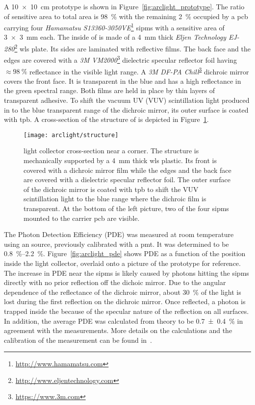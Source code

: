 A \SI{10 x 10}{\centi\metre} \AL{} prototype is shown in Figure~\ref{fig:arclight_prototype}.
The ratio of sensitive area to total area is \SI{98}{\percent} with the remaining \SI{2}{\percent} occupied by a \gls{pcb} carrying four \emph{Hamamatsu S13360-3050VE}\footnote{\url{http://www.hamamatsu.com}} \glspl{sipm} with a sensitive area of \SI{3 x 3}{\milli\metre} each.
The inside of \AL{} is made of a \SI{4}{\milli\metre} thick \emph{Eljen Technology EJ-280}\footnote{\url{http://www.eljentechnology.com}} \gls{wls} plate.
Its sides are laminated with reflective films.
The back face and the edges are covered with a \emph{3M VM2000}\footnote{\url{https://www.3m.com}\label{foot:3M}} dielectric specular reflector foil having $\approx \SI{98}{\percent}$ reflectance in the visible light range.
A \emph{3M DF-PA Chill}\textsuperscript{\ref{foot:3M}} dichroic mirror covers the front face.
It is transparent in the blue and has a high reflectance in the green spectral range.
Both films are held in place by thin layers of transparent adhesive.
To shift the vacuum UV (VUV) scintillation light produced in \lar{} to the blue transparent range of the dichroic mirror, its outer surface is coated with \gls{tpb}.
A cross-section of the structure of \AL{} is depicted in Figure~\ref{fig:arclight_structure}.

\begin{figure}[htb]
	\centering
	\texttt{[image: arclight/structure]}
	\caption{\AL{} light collector cross-section near a corner.
		The structure is mechanically supported by a \SI{4}{\milli\metre} thick \gls{wls} plastic.
		Its front is covered with a dichroic mirror film while the edges and the back face are covered with a dielectric specular reflector foil.
		The outer surface of the dichroic mirror is coated with \gls{tpb} to shift the \lar{} VUV scintillation light to the blue range where the dichroic film is transparent.
		At the bottom of the left picture, two of the four \glspl{sipm} mounted to the carrier \gls{pcb} are visible.}
	\label{fig:arclight_structure}
\end{figure}

The Photon Detection Efficiency (PDE) was measured at room temperature using an  source, previously calibrated with a \gls{pmt}.
It was determined to be \SIrange{0.8}{2.2}{\percent}.
Figure~\ref{fig:arclight_pde} shows PDE as a function of the position inside the light collector, overlaid onto a picture of the prototype for reference.
The increase in PDE near the \glspl{sipm} is likely caused by photons hitting the \glspl{sipm} directly with no prior reflection off the dichoic mirror.
Due to the angular dependence of the reflectance of the dichroic mirror, about \SI{30}{\percent} of the light is lost during the first reflection on the dichroic mirror.
Once reflected, a photon is trapped inside the \AL{} because of the specular nature of the reflection on all surfaces.
In addition, the average PDE was calculated from theory to be \SI{0.7 +- 0.4}{\percent} in agreement with the measurements.
More details on the calculations and the calibration of the measurement can be found in~\cite{arclight}.


